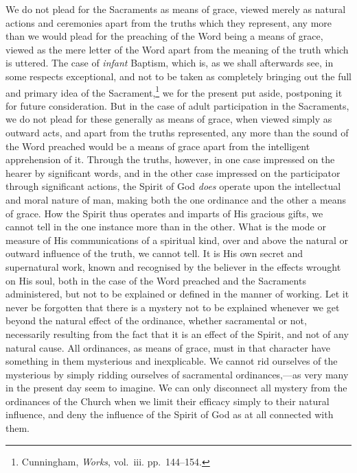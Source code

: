\documentclass[
]{book}
\begin{document}
We do not plead for the Sacraments as means of grace, viewed merely as natural actions and ceremonies apart from the truths which they represent, any more than we would plead for the preaching of the Word being a means of grace, viewed as the mere letter of the Word apart from the meaning of the truth which is uttered. The case of \emph{infant} Baptism, which is, as we shall afterwards see, in some respects exceptional, and not to be taken as completely bringing out the full and primary idea of the Sacrament,\footnote{Cunningham, \emph{Works}, vol.~iii. pp.~144--154.} we for the present put aside, postponing it for future consideration. But in the case of adult participation in the Sacraments, we do not plead for these generally as means of grace, when viewed simply as outward acts, and apart from the truths represented, any more than the sound of the Word preached would be a means of grace apart from the intelligent apprehension of it. Through the truths, however, in one case impressed on the hearer by significant words, and in the other case impressed on the participator through significant actions, the Spirit of God \emph{does} operate upon the intellectual and moral nature of man, making both the one ordinance and the other a means of grace. How the Spirit thus operates and imparts of His gracious gifts, we cannot tell in the one instance more than in the other. What is the mode or measure of His communications of a spiritual kind, over and above the natural or outward influence of the truth, we cannot tell. It is His own secret and supernatural work, known and recognised by the believer in the effects wrought on His soul, both in the case of the Word preached and the Sacraments administered, but not to be explained or defined in the manner of working. Let it never be forgotten that there is a mystery not to be explained whenever we get beyond the natural effect of the ordinance, whether sacramental or not, necessarily resulting from the fact that it is an effect of the Spirit, and not of any natural cause. All ordinances, as means of grace, must in that character have something in them mysterious and inexplicable. We cannot rid ourselves of the mysterious by simply ridding ourselves of sacramental ordinances,---as very many in the present day seem to imagine. We can only disconnect all mystery from the ordinances of the Church when we limit their efficacy simply to their natural influence, and deny the influence of the Spirit of God as at all connected with them.
\end{document}
